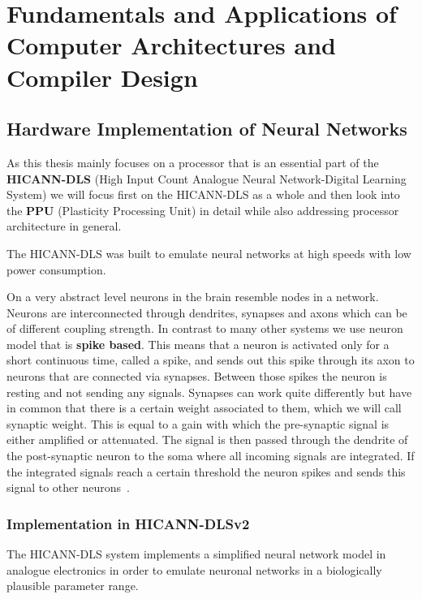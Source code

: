 \chapter{Fundamentals and Applications of Computer Architectures and Compiler Design}
\label{chapter:methods}

\section{Hardware Implementation of Neural Networks}
As this thesis mainly focuses on a processor that is an essential part of the \textbf{HICANN-DLS} (High Input Count Analogue Neural Network-Digital Learning System) we will focus first on the HICANN-DLS as a whole and then look into the \textbf{PPU} (Plasticity Processing Unit) in detail while also addressing processor architecture in general.

The HICANN-DLS was built to emulate neural networks at high speeds with low power consumption.

On a very abstract level neurons in the brain resemble nodes in a network.
Neurons are interconnected through dendrites, synapses and axons which can be of different coupling strength. 
In contrast to many other systems  we use neuron model that is \textbf{spike based}.
This means that a neuron is activated only for a short continuous time, called a spike, and sends out this spike through its axon to neurons that are connected via synapses.
Between those spikes the neuron is resting and not sending any signals.
Synapses can work quite differently but have in common that there is a certain weight associated to them, which we will call synaptic weight.
This is equal to a gain with which the pre-synaptic signal is either amplified or attenuated.
The signal is then passed through the dendrite of the post-synaptic neuron to the soma where all incoming signals are integrated.
If the integrated signals reach a certain threshold the neuron spikes and sends this signal to other neurons~\citep{silbernagl2009color}.


\subsection{Implementation in HICANN-DLSv2}
The HICANN-DLS system implements a simplified neural network model in analogue electronics in order to emulate neuronal networks in a biologically plausible parameter range.

